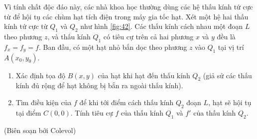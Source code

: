 \begin{enumerate}
     Vì tính chất độc đáo này, các nhà khoa học thường dùng các hệ thấu kính tứ cực từ để hội tụ các chùm hạt tích điện trong máy gia tốc hạt. Xét một hệ hai thấu kính tứ cực từ $Q_1$ và $Q_2$ như hình \ref{fig:42}. Các thấu kính cách nhau một đoạn $L$ theo phương $z$, và thấu kính $Q_1$ có tiêu cự trên cả hai phương $x$ và $y$ đều là $f_x = f_y = f$. Ban đầu, có một hạt nhỏ bắn dọc theo phương $z$ vào $Q_1$ tại vị trí $A(x_0, y_0)$. 

    \begin{enumerate}
        \item 
        Xác định tọa độ $B(x,y)$ của hạt khi hạt đến thấu kính $Q_2$ (giả sử các thấu kính đủ rộng để hạt không bị bắn ra ngoài thấu kính).
        \item 
        Tìm điều kiện của $f$ để khi tới điểm cách thấu kính $Q_2$ đoạn $L$, hạt sẽ hội tụ tại điểm $C(0,0)$. Tính tiêu cự $f$ của thấu kính $Q_1$ và $f'$ của thấu kính $Q_2$.
    \end{enumerate}
\end{enumerate}

\begin{flushright}
   \normalcolor(Biên soạn bởi Colevol)
\end{flushright}